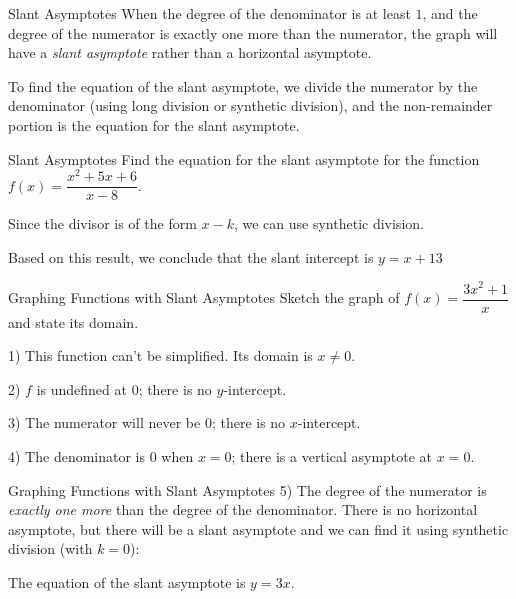 \documentclass[t, aspectratio=169]{beamer}
\begin{document}
	\begin{frame}{Slant Asymptotes}
		When the degree of the denominator is at least $1$, and the degree of the numerator is exactly one more than the numerator, the graph will have a \textit{slant asymptote} rather than a horizontal asymptote. \pause
		
		To find the equation of the slant asymptote, we divide the numerator by the denominator (using long division or synthetic division), and the non-remainder portion is the equation for the slant asymptote.
	\end{frame}

	\begin{frame}{Slant Asymptotes}
		Find the equation for the slant asymptote for the function $f(x) = \dfrac{x^2 + 5x + 6}{x-8}$. \pause
		
		Since the divisor is of the form $x - k$, we can use synthetic division. \pause
		
		
		Based on this result, we conclude that the slant intercept is $y = x + 13$
	\end{frame}

	\begin{frame}{Graphing Functions with Slant Asymptotes}
		Sketch the graph of $f(x) = \dfrac{3x^2 + 1}{x}$ and state its domain. \pause
		
		1) This function can't be simplified. Its domain is $x \neq 0$. \pause
		
		2) $f$ is undefined at $0$; there is no $y$-intercept. \pause
		
		3) The numerator will never be $0$; there is no $x$-intercept. \pause
		
		4) The denominator is $0$ when $x = 0$; there is a vertical asymptote at $x = 0$.
	\end{frame}

	\begin{frame}{Graphing Functions with Slant Asymptotes}
		5) The degree of the numerator is \textit{exactly one more} than the degree of the denominator. There is no horizontal asymptote, but there will be a slant asymptote and we can find it using synthetic division (with $k = 0$): \pause
		
		 \pause
		
		The equation of the slant asymptote is $y = 3x$.
	\end{frame}
\end{document}
